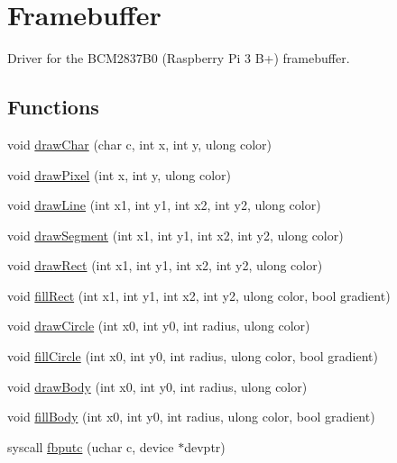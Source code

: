 \hypertarget{group__framebuffer}{\section{Framebuffer}
\label{group__framebuffer}
}


Driver for the B\-C\-M2837\-B0 (Raspberry Pi 3 B+) framebuffer.  


\subsection*{Functions}
\begin{DoxyCompactItemize}
\item 
void \hyperlink{group__framebuffer_ga2904d055d7c6862db8c9166a395106cb}{draw\-Char} (char c, int x, int y, ulong color)
\item 
void \hyperlink{group__framebuffer_ga503b1c35573399e40e3194caae4548c7}{draw\-Pixel} (int x, int y, ulong color)
\item 
void \hyperlink{group__framebuffer_gaa429a32ff09444b627786fd6c19b581e}{draw\-Line} (int x1, int y1, int x2, int y2, ulong color)
\item 
void \hyperlink{group__framebuffer_gae2b706c3c8323205874f3894f3fdedaa}{draw\-Segment} (int x1, int y1, int x2, int y2, ulong color)
\item 
void \hyperlink{group__framebuffer_ga2b5faeecb7efcf4098db82c4c52d97f2}{draw\-Rect} (int x1, int y1, int x2, int y2, ulong color)
\item 
void \hyperlink{group__framebuffer_ga4363c77931a2deda12d0300a7caa1897}{fill\-Rect} (int x1, int y1, int x2, int y2, ulong color, bool gradient)
\item 
void \hyperlink{group__framebuffer_ga44dc19680fd34418b4841cbaa85a71fd}{draw\-Circle} (int x0, int y0, int radius, ulong color)
\item 
void \hyperlink{group__framebuffer_gab888df48ec085eed4c0259ffdf4cc835}{fill\-Circle} (int x0, int y0, int radius, ulong color, bool gradient)
\item 
void \hyperlink{group__framebuffer_gac3a4b9c686abe9ca2eb5e6f14c60a62d}{draw\-Body} (int x0, int y0, int radius, ulong color)
\item 
void \hyperlink{group__framebuffer_gab48a4e6fc42403950e5f2b12e2382c9b}{fill\-Body} (int x0, int y0, int radius, ulong color, bool gradient)
\item 
syscall \hyperlink{group__framebuffer_gabd98f202f1503060580d385d288347b8}{fbputc} (uchar c, device $\ast$devptr)

\end{DoxyCompactItemize}
